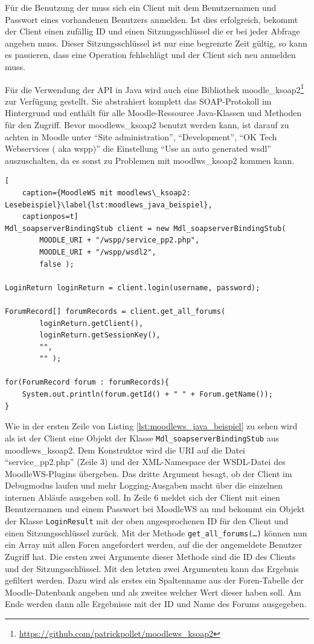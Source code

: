 Für die Benutzung der muss sich ein Client mit dem Benutzernamen und Passwort eines vorhandenen Benutzers anmelden. Ist dies erfolgreich, bekommt der Client einen zufällig ID und einen Sitzungsschlüssel die er bei jeder Abfrage angeben muss. Dieser Sitzungsschlüssel ist nur eine begrenzte Zeit gültig, so kann es passieren, dass eine Operation fehlschlägt und der Client sich neu anmelden muss.

Für die Verwendung der API in Java wird auch eine Bibliothek moodle\_ksoap2\footnote{\url{https://github.com/patrickpollet/moodlews\_ksoap2}} zur Verfügung gestellt. Sie abstrahiert komplett das SOAP-Protokoll im Hintergrund und enthält für alle Moodle-Ressource Java-Klassen und Methoden für den Zugriff. Bevor moodlews\_ksoap2 benutzt werden kann, ist darauf zu achten in Moodle unter \enquote{Site administration}, \enquote{Development}, \enquote {OK Tech Webservices ( aka wspp)} die Einstellung \enquote{Use an auto generated wsdl} auszuschalten, da es sonst zu Problemen mit moodlws\_ksoap2 kommen kann.

\begin{lstlisting}[
    caption={MoodleWS mit moodlews\_ksoap2: Lesebeispiel}\label{lst:moodlews_java_beispiel},
    captionpos=t]
Mdl_soapserverBindingStub client = new Mdl_soapserverBindingStub(
        MOODLE_URI + "/wspp/service_pp2.php",
        MOODLE_URI + "/wspp/wsdl2",
        false );

LoginReturn loginReturn = client.login(username, password);

ForumRecord[] forumRecords = client.get_all_forums(
        loginReturn.getClient(),
        loginReturn.getSessionKey(),
        "",
        "" );

for(ForumRecord forum : forumRecords){
    System.out.println(forum.getId() + " " + Forum.getName());
}
\end{lstlisting}

Wie in der ersten Zeile von Listing \ref{lst:moodlews_java_beispiel} zu sehen wird als ist der Client eine Objekt der Klasse \texttt{Mdl\_soapserverBindingStub} aus moodlews\_ksoap2. Dem Konstruktor wird die URI auf die Datei \enquote{service\_pp2.php} (Zeile 3) und der XML-Namespace der WSDL-Datei des MoodleWS-Plugins übergeben. Das dritte Argument besagt, ob der Client im Debugmodus laufen und mehr Logging-Ausgaben macht über die einzelnen internen Abläufe ausgeben soll. In Zeile 6 meldet sich der Client mit einen Benutzernamen und einem Passwort bei MoodleWS an und bekommt ein Objekt der Klasse \texttt{LoginResult} mit der oben angesprochenen ID für den Client und einen Sitzungsschlüssel zurück. Mit der Methode \texttt{get\_all\_forums(\dots)} können nun ein Array mit allen Foren angefordert werden, auf die der angemeldete Benutzer Zugriff hat. Die ersten zwei Argumente dieser Methode sind die ID des Clients und der Sitzungsschlüssel. Mit den letzten zwei Argumenten kann das Ergebnis gefiltert werden. Dazu wird als erstes ein Spaltenname aus der Foren-Tabelle der Moodle-Datenbank angeben und als zweites welcher Wert dieser haben soll. Am Ende werden dann alle Ergebnisse mit der ID und Name des Forums ausgegeben.

